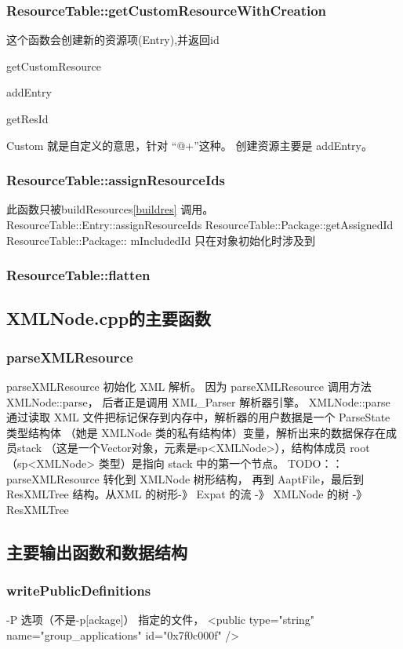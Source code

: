 \documentclass[a4paper,11pt]{article}
\begin{document}
\subsubsection{ResourceTable::getCustomResourceWithCreation}\label{gcrwc}
这个函数会创建新的资源项(Entry),并返回id
\begin{itemize*}
\item getCustomResource
\item addEntry
\item getResId
\end{itemize*}
Custom 就是自定义的意思，针对 “@+”这种。
创建资源主要是 addEntry。
\subsubsection{ResourceTable::assignResourceIds}\label{assignresids}
此函数只被buildResources\cref{buildres} 调用。
ResourceTable::Entry::assignResourceIds
ResourceTable::Package::getAssignedId
ResourceTable::Package:: mIncludedId 只在对象初始化时涉及到

\subsubsection{ResourceTable::flatten}\label{restblflatten}

\subsection{XMLNode.cpp的主要函数}
\subsubsection{parseXMLResource}\label{parsexmlres}
parseXMLResource 初始化 XML 解析。 因为 parseXMLResource 调用方法
XMLNode::parse， 后者正是调用 XML_Parser 解析器引擎。
XMLNode::parse 通过读取 XML
文件把标记保存到内存中，解析器的用户数据是一个 ParseState
类型结构体 （她是 XMLNode 类的私有结构体）变量，解析出来的数据保存在成员stack
（这是一个Vector对象，元素是sp<XMLNode>），结构体成员 root （sp<XMLNode>
类型）是指向 stack 中的第一个节点。 TODO：：
parseXMLResource   转化到 XMLNode 树形结构， 再到 AaptFile，最后到 ResXMLTree
结构。从XML 的树形-》 Expat 的流 -》 XMLNode 的树 -》 ResXMLTree

\subsection{主要输出函数和数据结构}

\subsubsection{writePublicDefinitions}
-P  选项（不是-p[ackage]）   指定的文件，  
<public type="string" name="group_applications" id="0x7f0c000f" />
\end{document}
